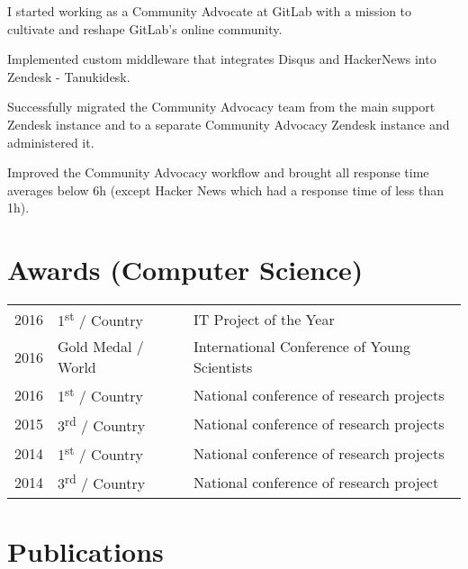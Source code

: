 \documentclass[]{matija-resume}
\begin{document}
\begin{minipage}[t]{0.66\textwidth}
\vspace{\topsep}
I started working as a Community Advocate at GitLab with a mission to cultivate and reshape GitLab's online community.
\vspace{\topsep}
\begin{tightemize}
\item Implemented custom middleware that integrates Disqus and HackerNews into Zendesk - Tanukidesk.
\item Successfully migrated the Community Advocacy team from the main support Zendesk instance and to a separate Community Advocacy Zendesk instance and administered it.
\item  Improved the Community Advocacy workflow and brought all response time averages below 6h (except Hacker News which had a response time of less than 1h).
\end{tightemize}
\sectionsep


\section{Awards (Computer Science)} 
\begin{tabular}{rll}
2016 & 1\textsuperscript{st} / Country & IT Project of the Year\\
2016 & Gold Medal / World & International Conference of Young Scientists\\
2016 & 1\textsuperscript{st} / Country & National conference of research projects\\
2015 & 3\textsuperscript{rd} / Country & National conference of research projects\\
2014 & 1\textsuperscript{st} / Country & National conference of research projects\\
2014 & 3\textsuperscript{rd} / Country & National conference of research project
\end{tabular}
\sectionsep


\section{Publications} 
\renewcommand\refname{\vskip -1.5em} %


\nocite{*}

\end{minipage} 
\end{document}
